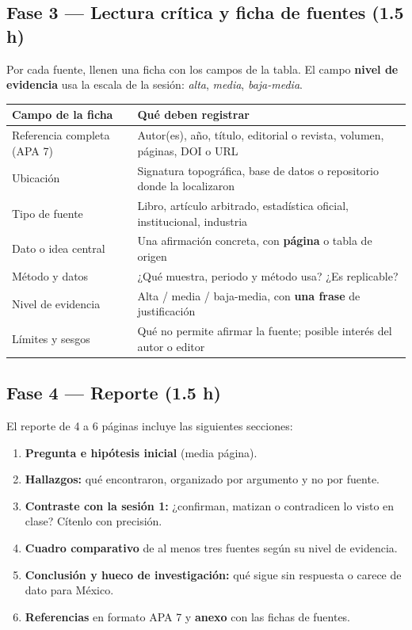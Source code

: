 \documentclass[11pt,letterpaper]{article}
\begin{document}
\subsection*{Fase 3 --- Lectura crítica y ficha de fuentes (1.5 h)}
Por cada fuente, llenen una ficha con los campos de la tabla. El campo
\textbf{nivel de evidencia} usa la escala de la sesión: \emph{alta},
\emph{media}, \emph{baja-media}.

\begin{center}
\small
\begin{tabular}{@{}>{\raggedright}p{4.3cm}>{\raggedright\arraybackslash}p{9.5cm}@{}}
\toprule
\textbf{Campo de la ficha} & \textbf{Qué deben registrar} \\
\midrule
Referencia completa (APA 7) & Autor(es), año, título, editorial o revista, volumen, páginas, DOI o URL \\
Ubicación & Signatura topográfica, base de datos o repositorio donde la localizaron \\
Tipo de fuente & Libro, artículo arbitrado, estadística oficial, institucional, industria \\
Dato o idea central & Una afirmación concreta, con \textbf{página} o tabla de origen \\
Método y datos & ¿Qué muestra, periodo y método usa? ¿Es replicable? \\
Nivel de evidencia & Alta / media / baja-media, con \textbf{una frase} de justificación \\
Límites y sesgos & Qué no permite afirmar la fuente; posible interés del autor o editor \\
\bottomrule
\end{tabular}
\end{center}

\subsection*{Fase 4 --- Reporte (1.5 h)}
El reporte de 4 a 6 páginas incluye las siguientes secciones:
\begin{enumerate}[leftmargin=1.4em, itemsep=3pt]
  \item \textbf{Pregunta e hipótesis inicial} (media página).
  \item \textbf{Hallazgos:} qué encontraron, organizado por argumento y no por fuente.
  \item \textbf{Contraste con la sesión 1:} ¿confirman, matizan o contradicen lo visto en clase? Cítenlo con precisión.
  \item \textbf{Cuadro comparativo} de al menos tres fuentes según su nivel de evidencia.
  \item \textbf{Conclusión y hueco de investigación:} qué sigue sin respuesta o carece de dato para México.
  \item \textbf{Referencias} en formato APA 7 y \textbf{anexo} con las fichas de fuentes.
\end{enumerate}
\end{document}
